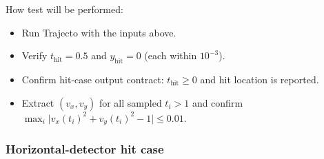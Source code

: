 \documentclass[12pt, titlepage]{article}
\begin{document}
\begin{enumerate}
How test will be performed:
\begin{itemize}
  \item Run Trajecto with the inputs above.
  \item Verify $t_{\mathrm{hit}}=0.5$ and $y_{\mathrm{hit}}=0$ (each within $10^{-3}$).
  \item Confirm hit-case output contract:
  $t_{\mathrm{hit}}\ge 0$ and hit location is reported.
  \item Extract $(v_x,v_y)$ for all sampled $t_i > 1$ and confirm
        $\max_i\bigl|v_x(t_i)^2+v_y(t_i)^2-1\bigr|\le 0.01$.
\end{itemize}

\end{enumerate}

\subsubsection{Horizontal-detector hit case}
\end{document}
